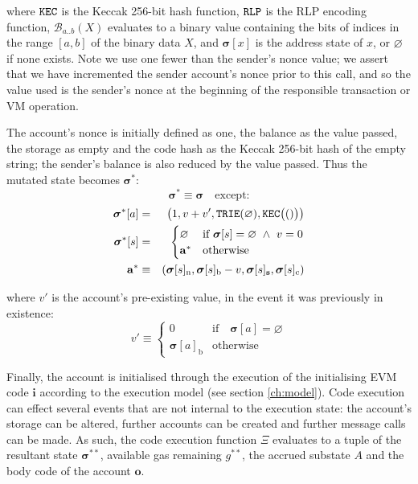 \documentclass[9pt,oneside]{amsart}
\begin{document}
\begin{multicols}{2}
where $\mathtt{\tiny KEC}$ is the Keccak 256-bit hash function, $\mathtt{\tiny RLP}$ is the RLP encoding function, $\mathcal{B}_{a..b}(X)$ evaluates to a binary value containing the bits of indices in the range $[a, b]$ of the binary data $X$, and $\boldsymbol{\sigma}[x]$ is the address state of $x$, or $\varnothing$ if none exists. Note we use one fewer than the sender's nonce value; we assert that we have incremented the sender account's nonce prior to this call, and so the value used is the sender's nonce at the beginning of the responsible transaction or VM operation.

The account's nonce is initially defined as one, the balance as the value passed, the storage as empty and the code hash as the Keccak 256-bit hash of the empty string; the sender's balance is also reduced by the value passed. Thus the mutated state becomes $\boldsymbol{\sigma}^*$:
\begin{equation}
\boldsymbol{\sigma}^* \equiv \boldsymbol{\sigma} \quad \text{except:}
\end{equation}
\begin{eqnarray}
\boldsymbol{\sigma}^*[a] &=& \big( 1, v + v', \mathtt{\tiny TRIE}(\varnothing), \mathtt{\tiny KEC}\big(()\big) \big) \\
\boldsymbol{\sigma}^*[s] &=& \begin{cases}
\varnothing & \text{if}\ \boldsymbol{\sigma}[s] = \varnothing \ \wedge\ v = 0 \\
\mathbf{a}^* & \text{otherwise}
\end{cases} \\
\mathbf{a}^* &\equiv& (\boldsymbol{\sigma}[s]_{\mathrm{n}}, \boldsymbol{\sigma}[s]_{\mathrm{b}} - v, \boldsymbol{\sigma}[s]_{\mathbf{s}}, \boldsymbol{\sigma}[s]_{\mathrm{c}})
\end{eqnarray}

where $v'$ is the account's pre-existing value, in the event it was previously in existence:
\begin{equation}
v' \equiv \begin{cases}
0 & \text{if} \quad \boldsymbol{\sigma}[a] = \varnothing\\
\boldsymbol{\sigma}[a]_{\mathrm{b}} & \text{otherwise}
\end{cases}
\end{equation}


Finally, the account is initialised through the execution of the initialising EVM code $\mathbf{i}$ according to the execution model (see section \ref{ch:model}). Code execution can effect several events that are not internal to the execution state: the account's storage can be altered, further accounts can be created and further message calls can be made. As such, the code execution function $\Xi$ evaluates to a tuple of the resultant state $\boldsymbol{\sigma}^{**}$, available gas remaining $g^{**}$, the accrued substate $A$ and the body code of the account $\mathbf{o}$.


\end{multicols}
\end{document}
